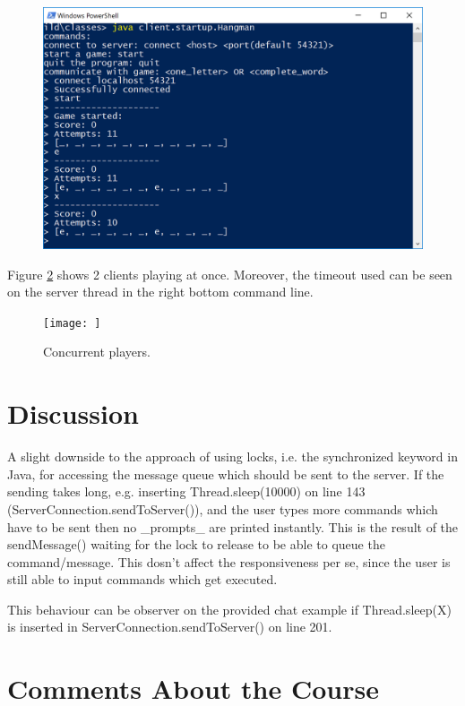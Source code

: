 \documentclass[a4paper]{scrartcl}
\begin{document}
\begin{figure}[h!]
  \begin{center}
    \includegraphics[scale=0.8]{ui.png}
    \caption{}
    \label{fig:ui}
  \end{center}
\end{figure}

Figure \ref{fig:multiple} shows 2 clients playing at once. Moreover, the timeout used can be seen on the server thread in the right bottom command line.

\begin{figure}[h!]
  \begin{center}
    \texttt{[image: ]}
    \caption{Concurrent players.}
    \label{fig:multiple}
  \end{center}
\end{figure}

\section{Discussion}

A slight downside to the approach of using locks, i.e. the synchronized keyword in Java, for accessing the message queue which should be sent to the server.
If the sending takes long, e.g. inserting Thread.sleep(10000) on line 143 (ServerConnection.sendToServer()), and the user types more commands which have to be sent then no _prompts_ are printed instantly.
This is the result of the sendMessage() waiting for the lock to release to be able to queue the command/message.
This dosn't affect the responsiveness per se, since the user is still able to input commands which get executed.

This behaviour can be observer on the provided chat example if Thread.sleep(X) is inserted in ServerConnection.sendToServer() on line 201.


\section{Comments About the Course}
\end{document}
